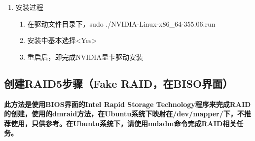 \begin{enumerate}
\item 安装过程 
	\begin{enumerate}
	\item 在驱动文件目录下，sudo ./NVIDIA-Linux-x86\_64-355.06.run
	\item 安装中基本选择<Yes>
	\item 重启后，即完成NVIDIA显卡驱动安装
	\end{enumerate}
\end{enumerate}

\subsection{创建RAID5步骤（Fake RAID，在BISO界面）}
\textbf{此方法是使用BIOS界面的Intel Rapid Storage Technology程序来完成RAID的创建，使用的dmraid方法，在Ubuntu系统下映射在/dev/mapper/下，不推荐使用，只供参考。在Ubuntu系统下，请使用mdadm命令完成RAID相关任务。}
